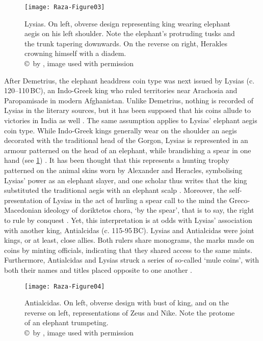 \documentclass{ijsra}
\renewcommand\BC{{\,BC\xspace}}
\begin{document}
\begin{figure}[!htb] %
	\centering
	\texttt{[image: Raza-Figure03]}
	\caption{Lysias. On left, obverse design representing king wearing elephant aegis on his left shoulder. Note the elephant’s protruding tusks and the trunk tapering downwards. On the reverse on right, Herakles crowning himself with a diadem. 
		{\normalfont\scriptsize \\ \copyright\ by \citeauthor{Coin}, image used with permission}}
	\label{fig:Raza-Figure03}
\end{figure}

After Demetrius, the elephant headdress coin type was next issued by Lysias (c. 120--110\BC), an Indo-Greek king who ruled
territories near Arachosia and Paropamisade in modern Afghanistan. 
Unlike Demetrius, nothing is recorded of Lysias in the literary sources, but it has been supposed that his coins allude to
victories in India as well \parencite[107]{Widemann2003}.
The same assumption applies to Lysias’ elephant aegis coin type. 
While Indo-Greek kings generally wear on the shoulder an aegis decorated with the traditional head of the Gorgon, Lysias is
represented in an armour patterned on the head of an elephant, while brandishing a spear in one hand (see \cref{fig:Raza-Figure03}) \parencite[71]{Whitehead1970}. 
It has been thought that this represents a hunting trophy patterned on the animal skins worn by Alexander and Heracles,
symbolising Lysias’ power as an elephant slayer, and one scholar thus writes that the king substituted the traditional aegis with
an elephant scalp \parencite[341]{Cribb2011}. 
Moreover, the self-presentation of Lysias in the act of hurling a spear call to the mind the Greco-Macedonian ideology of
doriktetos chora, ‘by the spear’, that is to say, the right to rule by conquest \parencite[27]{Billows1995}. 
Yet, this interpretation is at odds with Lysias’ association with another king, Antialcidas (c. 115-95\BC). 
Lysias and Antialcidas were joint kings, or at least, close allies. 
Both rulers share monograms, the marks made on coins by minting officials, indicating that they shared access to the same mints. 
Furthermore, Antialcidas and Lysias struck a series of so-called ‘mule coins’, with both their names and titles placed opposite to
one another \parencite[121]{Mairs2014}.

\begin{figure}[!htb] %
	\centering
	\texttt{[image: Raza-Figure04]}
	\caption{Antialcidas. On left, obverse design with bust of king, and on the reverse on left, representations of Zeus and Nike. Note the protome of an elephant trumpeting.
		{\normalfont\scriptsize \\ \copyright\ by \citeauthor{Coin}, image used with permission}}
	\label{fig:Raza-Figure04}
\end{figure}
\end{document}
